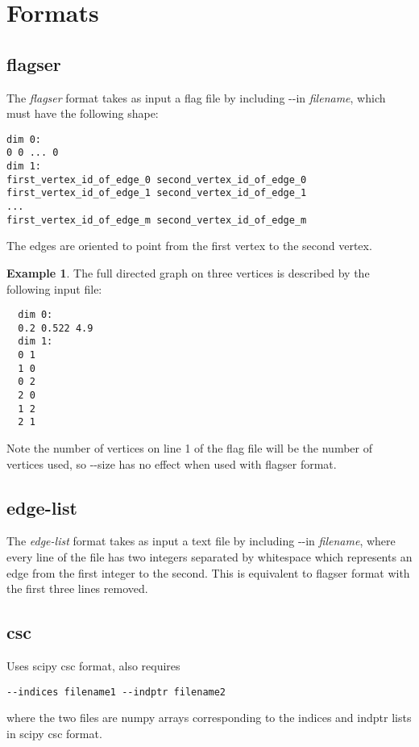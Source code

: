 \documentclass{amsart}
\theoremstyle{definition}
\newtheorem*{example*}{Example}
\begin{document}
\begin{description}
\end{description}

\vspace{1em}

\section{Formats}
\subsection{flagser}
\noindent
The \textit{flagser} format takes as input a flag file by including -{}-in \textit{filename}, which must have the following shape:

\vspace{.5em}
\begin{verbatim}
dim 0:
0 0 ... 0
dim 1:
first_vertex_id_of_edge_0 second_vertex_id_of_edge_0
first_vertex_id_of_edge_1 second_vertex_id_of_edge_1
...
first_vertex_id_of_edge_m second_vertex_id_of_edge_m
\end{verbatim}
\vspace{.5em}

\noindent
The edges are oriented to point from the first vertex to the second vertex.

\begin{example*}
  The full directed graph on three vertices is described by the
  following input file:

  \vspace{.5em}
  \begin{verbatim}
  dim 0:
  0.2 0.522 4.9
  dim 1:
  0 1
  1 0
  0 2
  2 0
  1 2
  2 1
  \end{verbatim}
\end{example*}

Note the number of vertices on line 1 of the flag file will be the number of vertices used, so -{}-size has no effect when used with flagser format.

\subsection{edge-list}
The \textit{edge-list} format takes as input a text file by including -{}-in \textit{filename}, where every line of the file has two integers separated by whitespace which represents an edge from the first integer to the second. This is equivalent to flagser format with the first three lines removed.

\subsection{csc}
Uses scipy csc format, also requires
\begin{verbatim}--indices filename1 --indptr filename2\end{verbatim}
where the two files are numpy arrays corresponding to the indices and indptr lists in scipy csc format.
\end{document}
